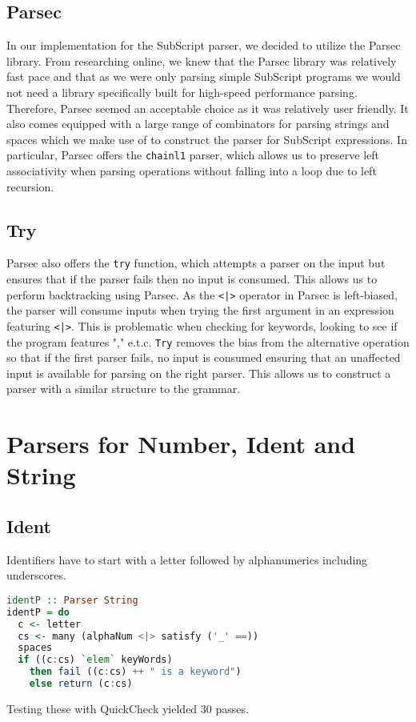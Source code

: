 \documentclass{article}
\begin{document}
\subsection{Parsec}
In our implementation for the SubScript parser, we decided to utilize the Parsec library. From researching online, we knew that the Parsec library was relatively fast pace and that as we were only parsing simple SubScript programs we would not need a library specifically built for high-speed performance parsing. Therefore, Parsec seemed an acceptable choice as it was relatively user friendly. It also comes equipped with a large range of combinators for parsing strings and spaces which we make use of to construct the parser for SubScript expressions. In particular, Parsec offers the \texttt{chainl1} parser, which allows us to preserve left associativity when parsing operations without falling into a loop due to left recursion.    

\subsection{Try}
Parsec also offers the \texttt{try} function, which attempts a parser on the input but ensures that if the parser fails then no input is consumed. This allows us to perform backtracking using Parsec. As the \texttt{<|>} operator in Parsec is left-biased, the parser will consume inputs when trying the first argument in an expression featuring \texttt{<|>}. This is problematic when checking for keywords, looking to see if the program features "," e.t.c. \texttt{Try} removes the bias from the alternative operation so that if the first parser fails, no input is consumed ensuring that an unaffected input is available for parsing on the right parser. This allows us to construct a parser with a similar structure to the grammar.


\section{Parsers for Number, Ident and String}
\subsection{Ident}
Identifiers have to start with a letter followed by alphanumerics including underscores.
\begin{lstlisting}[language=Haskell]
identP :: Parser String
identP = do
  c <- letter
  cs <- many (alphaNum <|> satisfy ('_' ==))
  spaces
  if ((c:cs) `elem` keyWords)
    then fail ((c:cs) ++ " is a keyword")
    else return (c:cs)
\end{lstlisting}
Testing these with QuickCheck yielded 30 passes.
\end{document}
